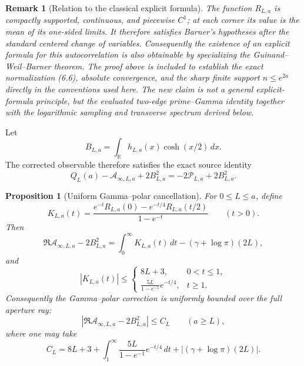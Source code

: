 \documentclass[11pt]{article}
\newtheorem{proposition}[theorem]{Proposition}
\newtheorem{remark}[theorem]{Remark}
\newcommand{\R}{\mathbb R}
\begin{document}
\begin{remark}[Relation to the classical explicit formula]
The function $R_{L,a}$ is compactly supported, continuous, and piecewise $C^1$; at each corner
its value is the mean of its one-sided limits.  It therefore satisfies Barner's hypotheses after
the standard centered change of variables.  Consequently the existence of an explicit formula
for this autocorrelation is also obtainable by specializing the Guinand--Weil--Barner theorem.
The proof above is included to establish the exact normalization \textup{(6.6)}, absolute
convergence, and the sharp finite support $n\le e^{2a}$ directly in the conventions used here.
The new claim is not a general explicit-formula principle, but the evaluated two-edge
prime--Gamma identity together with the logarithmic sampling and transverse spectrum derived
below.
\end{remark}

Let
\[
 B_{L,a}=\int_{\R}h_{L,a}(x)\cosh(x/2)\,dx.
 \tag{6.20}
\]
The corrected observable therefore satisfies the exact source identity
\[
 Q_L(a)-\mathcal A_{\infty,L,a}+2B_{L,a}^2
 =-2\mathcal P_{L,a}+2B_{L,a}^2.
 \tag{6.21}
\]

\begin{proposition}[Uniform Gamma--polar cancellation]
\label{prop:gamma-polar-uniform}
For $0\le L\le a$, define
\[
 K_{L,a}(t)=
 \frac{e^{-t}R_{L,a}(0)-e^{-t/4}R_{L,a}(t/2)}{1-e^{-t}}
 \qquad(t>0).
 \tag{6.21a}
\]
Then
\[
 \Re\mathcal A_{\infty,L,a}-2B_{L,a}^2
 =\int_0^\infty K_{L,a}(t)\,dt
  -(\gamma+\log\pi)(2L),
 \tag{6.21b}
\]
and
\[
 |K_{L,a}(t)|\le
 \begin{cases}
  8L+3,&0<t\le1,\\[2mm]
  \displaystyle\frac{5L}{1-e^{-1}}e^{-t/4},&t\ge1.
 \end{cases}
 \tag{6.21c}
\]
Consequently the Gamma--polar correction is uniformly bounded over the full aperture ray:
\[
 \left|\Re\mathcal A_{\infty,L,a}-2B_{L,a}^2\right|
 \le C_L
 \qquad(a\ge L),
 \tag{6.21d}
\]
where one may take
\[
 C_L=8L+3+
 \int_1^\infty\frac{5L}{1-e^{-1}}e^{-t/4}\,dt
 +|(\gamma+\log\pi)(2L)|.
\]
\end{proposition}
\end{document}
